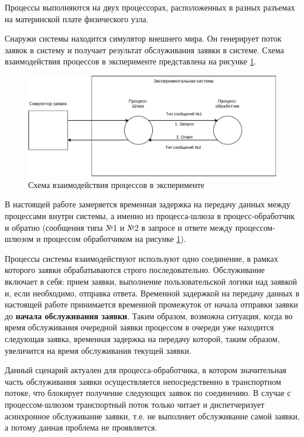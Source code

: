 Процессы выполняются на двух процессорах, расположенных в разных разъемах на материнской плате физического узла.

Снаружи системы находится симулятор внешнего мира. Он генерирует поток заявок в систему и получает результат обслуживания заявки в системе. Схема взаимодействия процессов в эксперименте представлена на рисунке \ref{chapter41:SystemSchema}.

\begin{figure}[!h]
\caption{Схема взаимодействия процессов в эксперименте}
\label{chapter41:SystemSchema}
\includegraphics[width=\textwidth]{../../graphics/schemes/SystemSchema}
\end{figure}

В настоящей работе замеряется временная задержка на передачу данных между процессами внутри системы, а именно из процесса-шлюза в процесс-обработчик и обратно (сообщения типа №1 и №2 в запросе и ответе между процессом-шлюзом и процессом обработчиком на рисунке \ref{chapter41:SystemSchema}).

Процессы системы взаимодействуют используют одно соединение, в рамках которого заявки обрабатываются строго последовательно.
Обслуживание включает в себя: прием заявки, выполнение пользовательской логики над заявкой и, если необходимо, отправка ответа.
Временной задержкой на передачу данных в настоящей работе принимается временной промежуток от начала отправки заявки до \textbf{начала обслуживания заявки}. Таким образом, возможна ситуация, когда во время обслуживания очередной заявки процессом в очереди уже находится следующая заявка, временная задержка на передачу которой, таким образом, увеличится на время обслуживания текущей заявки.

Данный сценарий актуален для процесса-обработчика, в котором значительная часть обслуживания заявки осуществляется непосредственно в транспортном потоке, что блокирует получение следующих заявок по соединению.
В случае с процессом-шлюзом транспортный поток только читает и диспетчеризует асинхронное обслуживание заявки, т.е. не выполняет обслуживание самой заявки, а потому данная проблема не проявляется.

